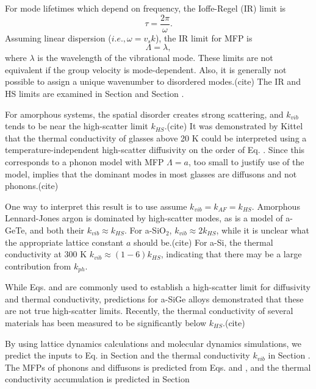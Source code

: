 \documentclass[aps,prb,twocolumn,superscriptaddress,footinbib,amsmath,amssymb,floatfix]{revtex4}
\begin{document}
For mode lifetimes which depend on frequency, the Ioffe-Regel (IR) limit 
is
\begin{equation}\label{EQ:IR_tau}
\tau = \frac{2\pi}{\omega}.
\end{equation}
Assuming linear dispersion ($i.e., \omega = v_s k$), the IR limit for 
MFP is 
\begin{equation}\label{EQ:IR_Lambda}
\Lambda = \lambda,
\end{equation}
where $\lambda$ is the wavelength of the vibrational mode. 
These limits are not equivalent if the group velocity 
is mode-dependent. Also, it is generally not possible to assign 
a unique wavenumber to disordered modes.(cite)  
The IR and HS limits are examined in Section 
and Section .

For amorphous systems, the 
spatial disorder creates strong scattering, and $k_{vib}$ tends to be 
near the high-scatter limit $k_{HS}$.(cite) 
It was demonstrated by Kittel that  
the thermal conductivity of glasses above 20 K could be interpreted 
using a temperature-independent high-scatter diffusivity on the order 
of Eq. .  
Since this corresponds to a phonon model with MFP $\Lambda = a$, 
too small to justify use of the model, implies that the dominant 
modes in most glasses are diffusons and not phonons.(cite)  

One way to interpret this result is to use assume 
$k_{vib} = k_{AF} = k_{HS}$. Amorphous Lennard-Jones argon is dominated 
by high-scatter modes,\cite{larkin_predicting_2013} as is a model of 
a-GeTe, and both their $k_{vib} \approx k_{HS}$.\cite{sosso_thermal_2012} 
For a-SiO$_2$, $k_{vib} \approx 2k_{HS}$, while it is unclear what the 
appropriate lattice constant $a$ should be.(cite)   
For a-Si, the thermal conductivity at 300 K $k_{vib} \approx (1-6) k_{HS}$, 
indicating that there may be a large contribution from $k_{ph}$. 

While Eqs. and are commonly used to establish a high-scatter limit for 
diffusivity and thermal conductivity, predictions for a-SiGe alloys 
demonstrated that these are not true high-scatter limits.
\cite{feldman_thermal_1993} Recently, the thermal conductivity 
of several materials has been measured to be significantly below 
$k_{HS}$.(cite) 

By using lattice dynamics calculations and molecular dynamics simulations, 
we predict the inputs to Eq. in Section and the 
thermal conductivity $k_{vib}$ in Section . The MFPs of phonons and 
diffusons is predicted from Eqs. and , and the thermal conductivity 
accumulation is predicted in Section 
\end{document}
